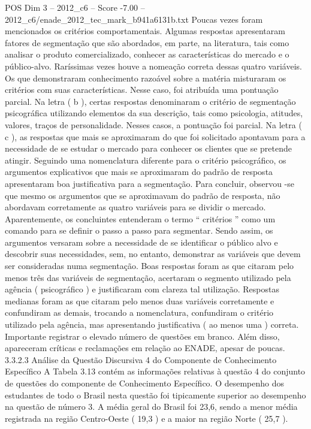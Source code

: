 \begin{textsample}{POS Dim 3 – 2012\_c6 – Score -7.00 – 2012\_c6/enade\_2012\_tec\_mark\_b941a6131b.txt}
Poucas vezes foram mencionados os critérios comportamentais.
Algumas respostas apresentaram fatores de segmentação que são abordados, em parte, na literatura, tais como analisar o produto comercializado, conhecer as características do mercado e o público-alvo.
Raríssimas vezes houve a nomeação correta dessas quatro variáveis.
Os que demonstraram conhecimento razoável sobre a matéria misturaram os critérios com suas características.
Nesse caso, foi atribuída uma pontuação parcial.
Na letra ( b ), certas respostas denominaram o critério de segmentação psicográfica utilizando elementos da sua descrição, tais como psicologia, atitudes, valores, traços de personalidade.
Nesses casos, a pontuação foi parcial.
Na letra ( c ), as respostas que mais se aproximaram do que foi solicitado apontavam para a necessidade de se estudar o mercado para conhecer os clientes que se pretende atingir.
Seguindo uma nomenclatura diferente para o critério psicográfico, os argumentos explicativos que mais se aproximaram do padrão de resposta apresentaram boa justificativa para a segmentação.
Para concluir, observou -se que mesmo os argumentos que se aproximavam do padrão de resposta, não abordavam corretamente as quatro variáveis para se dividir o mercado.
Aparentemente, os concluintes entenderam o termo “ critérios ” como um comando para se definir o passo a passo para segmentar.
Sendo assim, os argumentos versaram sobre a necessidade de se identificar o público alvo e descobrir suas necessidades, sem, no entanto, demonstrar as variáveis que devem ser consideradas numa segmentação.
Boas respostas foram as que citaram pelo menos três das variáveis de segmentação, acertaram o segmento utilizado pela agência ( psicográfico ) e justificaram com clareza tal utilização.
Respostas medianas foram as que citaram pelo menos duas variáveis corretamente e confundiram as demais, trocando a nomenclatura, confundiram o critério utilizado pela agência, mas apresentando justificativa ( ao menos uma ) correta.
Importante registrar o elevado número de questões em branco.
Além disso, apareceram críticas e reclamações em relação ao ENADE, apesar de poucas. 3.3.2.3 Análise da Questão Discursiva 4 do Componente de Conhecimento Específico A Tabela 3.13 contém as informações relativas à questão 4 do conjunto de questões do componente de Conhecimento Específico.
O desempenho dos estudantes de todo o Brasil nesta questão foi tipicamente superior ao desempenho na questão de número 3.
A média geral do Brasil foi 23,6, sendo a menor média registrada na região Centro-Oeste ( 19,3 ) e a maior na região Norte ( 25,7 ).

\end{textsample}
